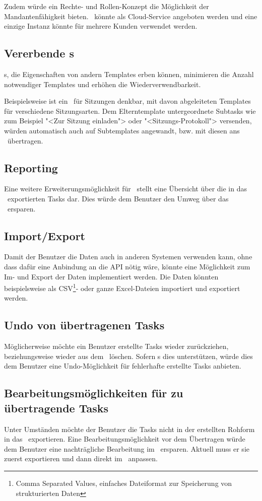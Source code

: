 			Zudem würde ein Rechte- und Rollen-Konzept die Möglichkeit der Mandantenfähigkeit bieten.
			\eeppi\ könnte als Cloud-Service angeboten werden und eine einzige Instanz könnte für mehrere Kunden verwendet werden.
			
		
		\subsection{Vererbende \ttpl s}
			\ttpl s, die Eigenschaften von andern Templates erben können, 
			minimieren die Anzahl notwendiger Templates und erhöhen die Wiederverwendbarkeit.
			
			Beispielsweise ist ein \ttpl\ für Sitzungen denkbar, mit
			davon abgeleiteten Templates für verschiedene Sitzungsarten.
			Dem Elterntemplate untergeordnete Subtasks wie zum Beispiel "<Zur Sitzung einladen"> oder "<Sitzungs-Protokoll"> versenden, würden automatisch auch auf Subtemplates angewandt, bzw. mit diesen ans \ppt\ übertragen.
			
		
		\subsection{Reporting}
			Eine weitere Erweiterungsmöglichkeit für \eeppi\ stellt eine Übersicht über die in das \ppt\ exportierten Tasks dar.
			Dies würde dem Benutzer den Umweg über das \ppt\ ersparen.
		
		\subsection{Import/Export}
			Damit der Benutzer die Daten auch in anderen Systemen verwenden kann,
			ohne dass dafür eine Anbindung an die API nötig wäre,
			könnte eine Möglichkeit zum Im- und Export der Daten implementiert werden.
			Die Daten könnten beispielsweise als CSV\footnote{Comma Separated Values, einfaches Dateiformat zur Speicherung von strukturierten Daten}- oder ganze Excel-Dateien importiert und exportiert werden.
		
		
		\subsection{Undo von übertragenen Tasks}
			Möglicherweise möchte ein Benutzer erstellte Tasks wieder zurückziehen,
			beziehungsweise wieder aus dem \ppt\ löschen.
			Sofern \ppt s dies unterstützen, würde dies dem Benutzer eine Undo-Möglichkeit für fehlerhafte erstellte Tasks anbieten.
		
		
		\subsection{Bearbeitungsmöglichkeiten für zu übertragende Tasks}
			Unter Umständen möchte der Benutzer die Tasks nicht in der erstellten Rohform in das \ppt\ exportieren.
			Eine Bearbeitungsmöglichkeit vor dem Übertragen würde dem Benutzer eine nachträgliche Bearbeitung im \ppt\ ersparen.
			Aktuell muss er sie zuerst exportieren und dann direkt im \ppt\ anpassen.
			
